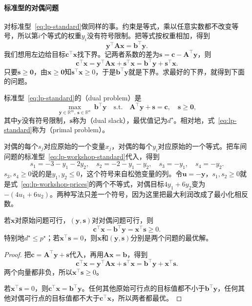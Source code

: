 \paragraph{标准型的对偶问题}
对标准型~\eqref{eq:lp-standard}做同样的事。约束是等式，乘以任意实数都不改变等号，所以第$i$个等式的权重$y_i$没有符号限制。把等式按权重相加，得到
\[
 \bm{y}^\top\bm{A}\bm{x}=\bm{b}^\top\bm{y}.
\]
我们想用左边给目标$\bm{c}^\top\bm{x}$找下界。记两者系数的差为$\bm{s}=\bm{c}-\bm{A}^\top\bm{y}$，则
\[
 \bm{c}^\top\bm{x}=\bm{y}^\top\bm{A}\bm{x}+\bm{s}^\top\bm{x}=\bm{b}^\top\bm{y}+\bm{s}^\top\bm{x}.
\]
只要$\bm{s}\geq\bm{0}$，由$\bm{x}\geq\bm{0}$知$\bm{s}^\top\bm{x}\geq0$，于是$\bm{b}^\top\bm{y}$就是下界。求最好的下界，就得到下面的问题。

\begin{definition}[线性规划的对偶问题]
 \label{def:lp-dual}
 标准型~\eqref{eq:lp-standard}的（dual problem）是
 \begin{equation}
  \max_{\bm{y}\in\mathbb{R}^m,\ \bm{s}\in\mathbb{R}^n}\ \bm{b}^\top\bm{y}
  \quad\text{s.t.}\quad\bm{A}^\top\bm{y}+\bm{s}=\bm{c},\quad\bm{s}\geq\bm{0},
  \label{eq:lp-dual}
 \end{equation}
 其中$\bm{y}$没有符号限制，$\bm{s}$称为（dual slack），最优值记为$d^\star$。相对地，式~\eqref{eq:lp-standard}称为（primal problem）。
\end{definition}

对偶的每个$s_j$对应原始的一个变量$x_j$，对偶的每个$y_i$对应原始的一个等式。把车间问题的标准型~\eqref{eq:lp-workshop-standard}代入，得到
\[
 s_1=-3-y_1-2y_2,\quad s_2=-2-y_1-y_2,\quad s_3=-y_1,\quad s_4=-y_2.
\]
$s_3,s_4\geq0$说的是$y_1,y_2\leq0$，这个符号来自松弛变量的列。令$\bm{u}=-\bm{y}$，$s_1,s_2\geq0$就是式~\eqref{eq:lp-workshop-prices}的两个不等式，对偶目标$4y_1+6y_2$变为$-(4u_1+6u_2)$。两种写法只差一个符号，因为这里把最大利润改成了最小化相反数。

\begin{theorem}[弱对偶]
 \label{thm:lp-weak-duality}
 若$\bm{x}$对原始问题可行，$(\bm{y},\bm{s})$对对偶问题可行，则
 \begin{equation}
  \bm{c}^\top\bm{x}-\bm{b}^\top\bm{y}=\bm{x}^\top\bm{s}\geq0.
  \label{eq:lp-weak-duality}
 \end{equation}
 特别地$d^\star\leq p^\star$；若$\bm{x}^\top\bm{s}=0$，则$\bm{x}$和$(\bm{y},\bm{s})$分别是两个问题的最优解。
\end{theorem}

\begin{proof}
 把$\bm{c}=\bm{A}^\top\bm{y}+\bm{s}$代入，再用$\bm{A}\bm{x}=\bm{b}$，得到
 \[
  \bm{c}^\top\bm{x}=\bm{y}^\top\bm{A}\bm{x}+\bm{s}^\top\bm{x}=\bm{b}^\top\bm{y}+\bm{x}^\top\bm{s}.
 \]
 两个向量都非负，所以$\bm{x}^\top\bm{s}\geq0$。

 若$\bm{x}^\top\bm{s}=0$，则$\bm{c}^\top\bm{x}=\bm{b}^\top\bm{y}$。任何其他原始可行点的目标值都不小于$\bm{b}^\top\bm{y}$，任何其他对偶可行点的目标值都不大于$\bm{c}^\top\bm{x}$，所以两者都最优。
\end{proof}

